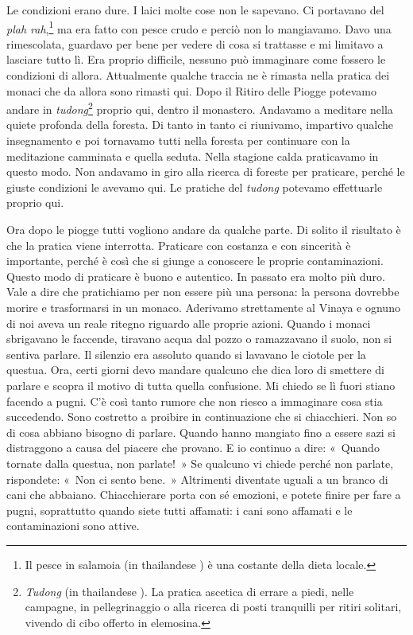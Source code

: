 Le condizioni erano dure. I laici molte cose non le sapevano. Ci
portavano del \emph{plah rah},\footnote{Il pesce in salamoia (in
  thailandese
  \href{http://www.thai2english.com/dictionary/1369771.html}{})
  è una costante della dieta locale.} ma era fatto con pesce crudo e
perciò non lo mangiavamo. Davo una rimescolata, guardavo per bene per
vedere di cosa si trattasse e mi limitavo a lasciare tutto lì. Era
proprio difficile, nessuno può immaginare come fossero le condizioni di
allora. Attualmente qualche traccia ne è rimasta nella pratica dei
monaci che da allora sono rimasti qui. Dopo il Ritiro delle Piogge
potevamo andare in \emph{tudong}\footnote{\emph{Tudong} (in thailandese
  ). La pratica ascetica di errare a piedi, nelle campagne, in
  pellegrinaggio o alla ricerca di posti tranquilli per ritiri solitari,
  vivendo di cibo offerto in elemosina.} proprio qui, dentro il
monastero. Andavamo a meditare nella quiete profonda della foresta. Di
tanto in tanto ci riunivamo, impartivo qualche insegnamento e poi
tornavamo tutti nella foresta per continuare con la meditazione
camminata e quella seduta. Nella stagione calda praticavamo in questo
modo. Non andavamo in giro alla ricerca di foreste per praticare, perché
le giuste condizioni le avevamo qui. Le pratiche del \emph{tudong}
potevamo effettuarle proprio qui.

Ora dopo le piogge tutti vogliono andare da qualche parte. Di solito il
risultato è che la pratica viene interrotta. Praticare con costanza e
con sincerità è importante, perché è così che si giunge a conoscere le
proprie contaminazioni. Questo modo di praticare è buono e autentico. In
passato era molto più duro. Vale a dire che pratichiamo per non essere
più una persona: la persona dovrebbe morire e trasformarsi in un monaco.
Aderivamo strettamente al Vinaya e ognuno di noi aveva un reale ritegno
riguardo alle proprie azioni. Quando i monaci sbrigavano le faccende,
tiravano acqua dal pozzo o ramazzavano il suolo, non si sentiva parlare.
Il silenzio era assoluto quando si lavavano le ciotole per la questua.
Ora, certi giorni devo mandare qualcuno che dica loro di smettere di
parlare e scopra il motivo di tutta quella confusione. Mi chiedo se lì
fuori stiano facendo a pugni. C'è così tanto rumore che non riesco a
immaginare cosa stia succedendo. Sono costretto a proibire in
continuazione che si chiacchieri. Non so di cosa abbiano bisogno di
parlare. Quando hanno mangiato fino a essere sazi si distraggono a causa
del piacere che provano. E io continuo a dire: «~Quando tornate dalla
questua, non parlate!~» Se qualcuno vi chiede perché non parlate,
rispondete: «~Non ci sento bene.~» Altrimenti diventate uguali a un
branco di cani che abbaiano. Chiacchierare porta con sé emozioni, e
potete finire per fare a pugni, soprattutto quando siete tutti affamati:
i cani sono affamati e le contaminazioni sono attive.

